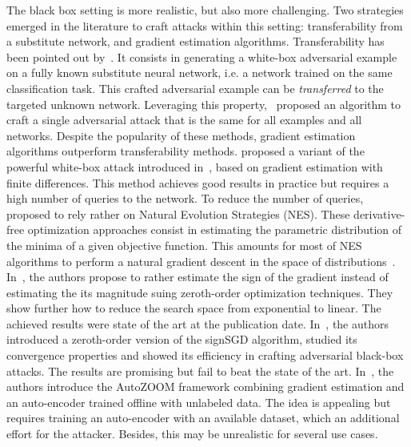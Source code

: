 The black box setting is more realistic, but also more challenging. Two strategies emerged in the literature to craft attacks within this setting: transferability from a substitute network, and gradient estimation algorithms. Transferability has been pointed out by~\cite{Papernot2017PBA}. It  consists in generating a white-box adversarial example on a fully known substitute neural network, i.e. a network trained on the same classification task.  This crafted adversarial example can be \textit{transferred} to the targeted unknown network. Leveraging this property,~\cite{moosavi2017universal} proposed an algorithm to craft a single adversarial attack that is the same for all examples and all networks. Despite the popularity of these methods, gradient estimation algorithms outperform transferability methods. \cite{chen2017zoo} proposed a variant of the powerful white-box attack introduced in~\citep{carlini2017towards}, based on  gradient estimation with finite differences. This method achieves good results  in practice but requires a high number of queries to the network. To reduce the number of queries, \cite{ilyas2018black}  proposed to rely rather on Natural Evolution Strategies (NES). These derivative-free optimization approaches consist in estimating the parametric distribution of the minima of a given objective function. This amounts for most of NES algorithms to perform a natural gradient descent in the space of distributions~\citep{ollivier17igo}. %
In~\citep{aldujaili2019bit}, the authors propose to rather estimate the sign of the gradient instead of estimating the its magnitude suing zeroth-order optimization techniques. They show further how to reduce the search space from exponential to linear. The achieved results were state of the art at the publication date.  In~\cite{liu2019signsgd}, the authors introduced a zeroth-order version of the signSGD algorithm, studied its convergence properties and showed its efficiency in crafting adversarial black-box attacks. The results are promising but fail to beat the state of the art. In~\cite{tu2019autozoom}, the authors introduce the AutoZOOM framework combining gradient estimation and an auto-encoder trained offline with unlabeled data. The idea is appealing but requires training an auto-encoder with an available dataset, which an additional effort for the attacker. Besides, this may be unrealistic for several use cases.
